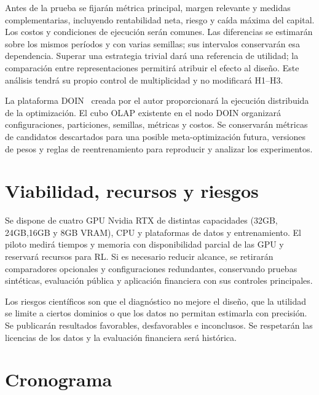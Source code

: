 \documentclass[11pt,letterpaper]{article}
\begin{document}
Antes de la prueba se fijarán métrica principal, margen relevante y medidas complementarias, incluyendo rentabilidad neta, riesgo y caída máxima del capital. Los costos y condiciones de ejecución serán comunes. Las diferencias se estimarán sobre los mismos períodos y con varias semillas; sus intervalos conservarán esa dependencia. Superar una estrategia trivial dará una referencia de utilidad; la comparación entre representaciones permitirá atribuir el efecto al diseño. Este análisis tendrá su propio control de multiplicidad y no modificará H1--H3.

La plataforma DOIN~\cite{doin} creada por el autor proporcionará la ejecución distribuida de la optimización. El cubo OLAP existente en el nodo DOIN organizará configuraciones, particiones, semillas, métricas y costos. Se conservarán métricas de candidatos descartados para una posible meta-optimización futura, versiones de pesos y reglas de reentrenamiento para reproducir y analizar los experimentos.

\section{Viabilidad, recursos y riesgos}

Se dispone de cuatro GPU Nvidia RTX de distintas capacidades (32GB, 24GB,16GB y 8GB VRAM), CPU y plataformas de datos y entrenamiento. El piloto medirá tiempos y memoria con disponibilidad parcial de las GPU y reservará recursos para RL. Si es necesario reducir alcance, se retirarán comparadores opcionales y configuraciones redundantes, conservando pruebas sintéticas, evaluación pública y aplicación financiera con sus controles principales.

Los riesgos científicos son que el diagnóstico no mejore el diseño, que la utilidad se limite a ciertos dominios o que los datos no permitan estimarla con precisión. Se publicarán resultados favorables, desfavorables e inconclusos. Se respetarán las licencias de los datos y la evaluación financiera será histórica.

\section{Cronograma}
\end{document}
